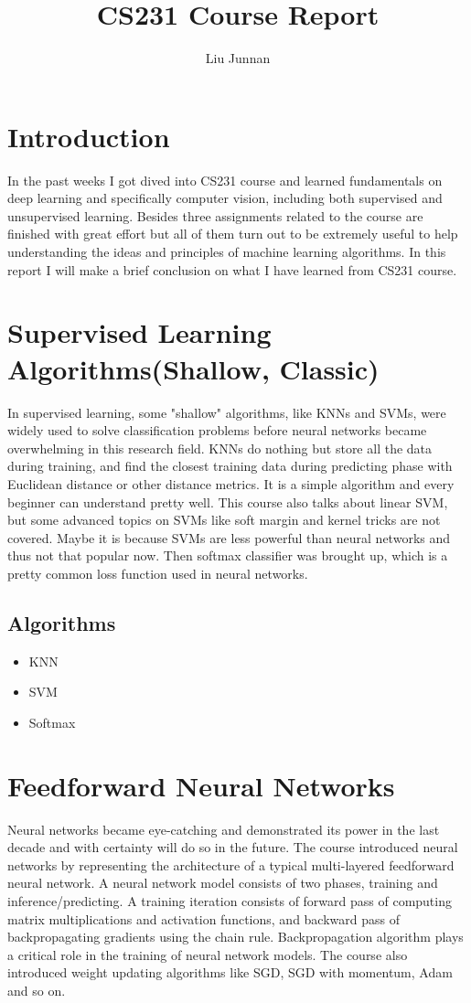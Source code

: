 \documentclass{article} %
\title{CS231 Course Report}
\author{
Liu Junnan
}
\begin{document}
\maketitle

\section{Introduction}
In the past weeks I got dived into CS231 course and learned fundamentals on deep learning and specifically computer vision, including both supervised and unsupervised learning. Besides three assignments related to the course are finished with great effort but all of them turn out to be extremely useful to help understanding the ideas and principles of machine learning algorithms. In this report I will make a brief conclusion on what I have learned from CS231 course.


\section{Supervised Learning Algorithms(Shallow, Classic)}
In supervised learning, some "shallow" algorithms, like KNNs and SVMs, were widely used to solve classification problems before neural networks became overwhelming in this research field. KNNs do nothing but store all the data during training, and find the closest training data during predicting phase with Euclidean distance or other distance metrics. It is a simple algorithm and every beginner can understand pretty well. This course also talks about linear SVM, but some advanced topics on SVMs like soft margin and kernel tricks are not covered. Maybe it is because SVMs are less powerful than neural networks and thus not that popular now. Then softmax classifier was brought up, which is a pretty common loss function used in neural networks.

\subsection{Algorithms}
\begin{itemize}
	\item KNN
	\item SVM
	\item Softmax
\end{itemize}


\section{Feedforward Neural Networks}
Neural networks became eye-catching and demonstrated its power in the last decade and with certainty will do so in the future. The course introduced neural networks by representing the architecture of a typical multi-layered feedforward neural network. A neural network model consists of two phases, training and inference/predicting. A training iteration consists of forward pass of computing matrix multiplications and activation functions, and backward pass of backpropagating gradients using the chain rule. Backpropagation algorithm plays a critical role in the training of neural network models. The course also introduced weight updating algorithms like SGD, SGD with momentum, Adam and so on.
\end{document}
